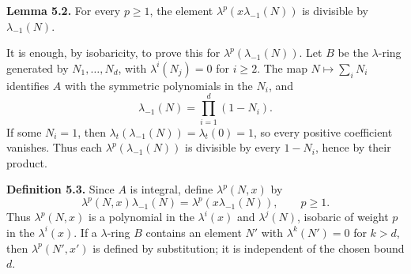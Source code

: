 \textbf{Lemma 5.2.} For every \(p\ge1\), the element \(\lambda^p(x\lambda_{-1}(N))\) is divisible by \(\lambda_{-1}(N)\).

It is enough, by isobaricity, to prove this for \(\lambda^p(\lambda_{-1}(N))\). Let \(B\) be the \(\lambda\)-ring generated by \(N_1,\ldots,N_d\), with \(\lambda^i(N_j)=0\) for \(i\ge2\). The map \(N\mapsto\sum_iN_i\) identifies \(A\) with the symmetric polynomials in the \(N_i\), and
\[
  \lambda_{-1}(N)=\prod_{i=1}^{d}(1-N_i).
\]
If some \(N_i=1\), then \(\lambda_t(\lambda_{-1}(N))=\lambda_t(0)=1\), so every positive coefficient vanishes. Thus each \(\lambda^p(\lambda_{-1}(N))\) is divisible by every \(1-N_i\), hence by their product.

\textbf{Definition 5.3.} Since \(A\) is integral, define \(\lambda^p(N,x)\) by
\begin{equation}\tag{5.3.1}
  \lambda^p(N,x)\lambda_{-1}(N)=\lambda^p(x\lambda_{-1}(N)),
  \qquad p\ge1.
\end{equation}
Thus \(\lambda^p(N,x)\) is a polynomial in the \(\lambda^i(x)\) and \(\lambda^j(N)\), isobaric of weight \(p\) in the \(\lambda^i(x)\). If a \(\lambda\)-ring \(B\) contains an element \(N'\) with \(\lambda^k(N')=0\) for \(k>d\), then \(\lambda^p(N',x')\) is defined by substitution; it is independent of the chosen bound \(d\).

